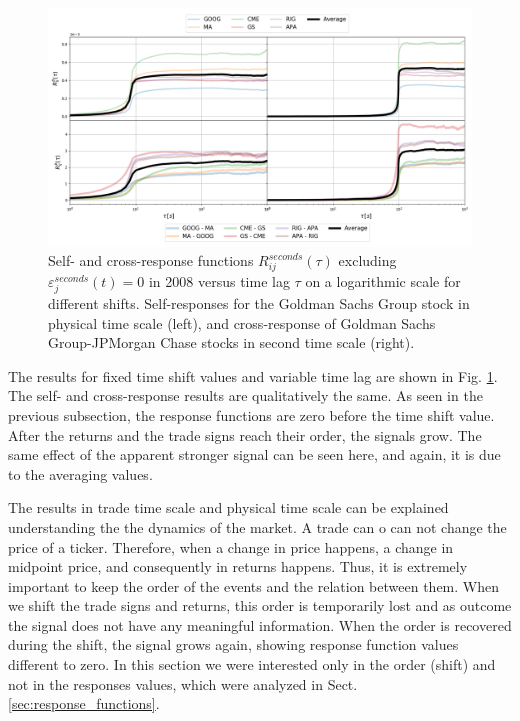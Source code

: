 \begin{figure}[htbp]
    \centering
    \includegraphics[width=\textwidth]{figures/04_shift_responses_physical.png}
    \caption{Self- and cross-response functions
             $R^{seconds}_{ij}\left(\tau\right)$ excluding
             $\varepsilon^{seconds}_{j}\left(t\right) = 0$ in 2008 versus time
             lag $\tau$ on a logarithmic scale for different shifts.
             Self-responses for the Goldman Sachs Group stock in physical time
             scale (left), and cross-response of Goldman Sachs Group-JPMorgan
             Chase stocks in second time scale (right).}
    \label{fig:shift_responses_physical_scale}
\end{figure}

The results for fixed time shift values and variable time lag are shown in Fig.
\ref{fig:shift_responses_physical_scale}. The self- and cross-response results
are qualitatively the same. As seen in the previous subsection, the response
functions are zero before the time shift value. After the returns and the trade
signs reach their order, the signals grow. The same effect of the apparent stronger
signal can be seen here, and again, it is due to the averaging values.

The results in trade time scale and physical time scale can be explained understanding
the the dynamics of the market. A trade can o can not change the price of a ticker. Therefore,
when a change in price happens, a change in midpoint price, and consequently in returns happens.
Thus, it is extremely important to keep the order of the events and the relation between them.
When we shift the trade signs and returns, this order is temporarily lost and as
outcome the signal does not have any meaningful information. When the order is
recovered during the shift, the signal grows again, showing response function
values different to zero. In this section we were interested only in the order (shift)
and not in the responses values, which were analyzed in Sect. \ref{sec:response_functions}.